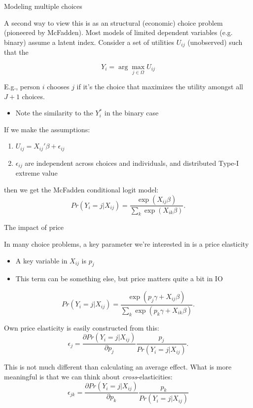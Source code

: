 \documentclass[notes,11pt, aspectratio=169]{beamer}
\newenvironment{wideitemize}{\itemize\addtolength{\itemsep}{10pt}}{\enditemize}
\begin{document}
\begin{frame}{Modeling multiple choices}
    \begin{wideitemize}
    \item A second way to view this is as an structural (economic)
      choice problem (pioneered by McFadden).  Most models of limited
      dependent variables (e.g. binary) assume a latent
      index. Consider a set of utilities $U_{ij}$ (unobserved) such
      that the

      $$Y_{i} = \arg\max_{j \in \Omega}U_{ij}$$

    \item E.g., person $i$ chooses $j$ if it's the choice that
      maximizes the utility amongst all $J+1$ choices.
      \begin{itemize}
      \item Note the similarity to the $Y^{*}_{i}$ in the binary case
      \end{itemize}

    \item If we make the assumptions:
      \begin{enumerate}
      \item  $U_{ij} = X_{ij}'\beta + \epsilon_{ij}$
      \item $\epsilon_{ij}$ are independent across choices and
        individuals, and distributed Type-I extreme value
      \end{enumerate}

      then we get the McFadden conditional logit model:
      $$Pr(Y_{i} = j | X_{ij}) = \frac{\exp(X_{ij}\beta)}{\sum_{k}\exp(X_{ik}\beta)}.$$
      
  \end{wideitemize}
\end{frame}

\begin{frame}{The impact of price}
  \begin{wideitemize}
  \item In many choice problems, a key parameter we're interested in
    is a price elasticity
  \begin{itemize}
  \item A key variable in $X_{ij}$ is $p_{j}$
  \item This term can be something else, but price matters quite a bit in IO
  \end{itemize}
  $$Pr(Y_{i} = j | X_{ij}) = \frac{\exp(p_{j}\gamma + X_{ij}\beta)}{\sum_{k}\exp(p_{k}\gamma +  X_{ik}\beta)}.$$
\item Own price elasticity is easily constructed from this:
      $$\epsilon_{j} = \frac{\partial Pr(Y_{i} = j | X_{ij})}{\partial p_{j}}\frac{p_{j}}{Pr(Y_{i} = j | X_{ij})}.$$
    \item This is not much different than calculating an average
      effect. What is more meaningful is that we can think about
      \emph{cross}-elasticities:
      $$\epsilon_{jk} = \frac{\partial Pr(Y_{i} = j | X_{ij})}{\partial p_{k}}\frac{p_{k}}{Pr(Y_{i} = j | X_{ij})}$$
    \end{wideitemize}
\end{frame}
\end{document}
